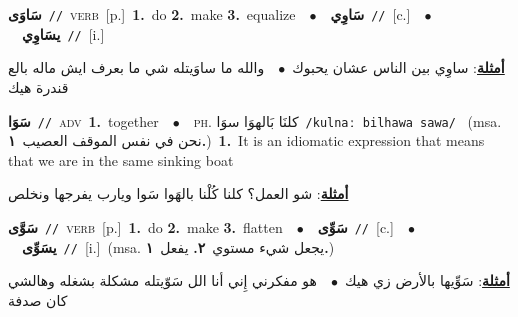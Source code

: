 \documentclass[10pt,a4paper,twoside]{article} %
\begin{document}
\begin{multicols}{2}
{\setlength\topsep{0pt}\textbf{\foreignlanguage{arabic}{سَاوَى}}\ {\color{gray}\texttt{//}\color{black}}\ \textsc{verb}\ [p.]\ \textbf{1.}~do  \textbf{2.}~make  \textbf{3.}~equalize\ \ $\bullet$\ \ \setlength\topsep{0pt}\textbf{\foreignlanguage{arabic}{سَاوِي}}\ {\color{gray}\texttt{//}\color{black}}\ [c.]\ \ $\bullet$\ \ \setlength\topsep{0pt}\textbf{\foreignlanguage{arabic}{يسَاوِي}}\ {\color{gray}\texttt{//}\color{black}}\ [i.]\  \begin{flushright}\color{gray}\foreignlanguage{arabic}{\textbf{\underline{\foreignlanguage{arabic}{أمثلة}}}: ساوِي بين الناس عشان يحبوك\ $\bullet$\ \  والله ما ساوَيتله شي ما بعرف ايش ماله بالع قندرة هيك}\end{flushright}\color{black}} \vspace{2mm}

{\setlength\topsep{0pt}\textbf{\foreignlanguage{arabic}{سَوَا}}\ {\color{gray}\texttt{//}\color{black}}\ \textsc{adv}\ \textbf{1.}~together\ \ $\bullet$\ \ \textsc{ph.} \color{gray} \foreignlanguage{arabic}{كلنَا بَالهوَا سوَا}\color{black}\ {\color{gray}\texttt{/{\sffamily kulnaː bilhawa sawa}/}\color{black}}\ \color{gray} (msa. \foreignlanguage{arabic}{نحن في نفس الموقف العصيب}~\foreignlanguage{arabic}{\textbf{١.}})\color{black}\ \textbf{1.}~It is an idiomatic expression that means that we are in the same sinking boat\  \begin{flushright}\color{gray}\foreignlanguage{arabic}{\textbf{\underline{\foreignlanguage{arabic}{أمثلة}}}: شو العمل؟ كلنا كُلْنا بالهَوا سَوا ويارب يفرجها ونخلص}\end{flushright}\color{black}} \vspace{2mm}

{\setlength\topsep{0pt}\textbf{\foreignlanguage{arabic}{سَوَّى}}\ {\color{gray}\texttt{//}\color{black}}\ \textsc{verb}\ [p.]\ \textbf{1.}~do  \textbf{2.}~make  \textbf{3.}~flatten\ \ $\bullet$\ \ \setlength\topsep{0pt}\textbf{\foreignlanguage{arabic}{سَوِّى}}\ {\color{gray}\texttt{//}\color{black}}\ [c.]\ \ $\bullet$\ \ \setlength\topsep{0pt}\textbf{\foreignlanguage{arabic}{يسَوِّى}}\ {\color{gray}\texttt{//}\color{black}}\ [i.]\ \color{gray}(msa. \foreignlanguage{arabic}{يجعل شيء مستوي}~\foreignlanguage{arabic}{\textbf{٢.}}  \foreignlanguage{arabic}{يفعل}~\foreignlanguage{arabic}{\textbf{١.}})\color{black}\  \begin{flushright}\color{gray}\foreignlanguage{arabic}{\textbf{\underline{\foreignlanguage{arabic}{أمثلة}}}: سَوِّيها بالأرض زي هيك\ $\bullet$\ \  هو مفكرني إِني أنا الل سَوّيتله مشكلة بشغله وهالشي كان صدفة}\end{flushright}\color{black}} \vspace{2mm}


\end{multicols}
\end{document}
